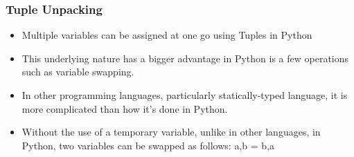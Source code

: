 \documentclass{beamer}
\begin{document}
\begin{frame}
\frametitle{Tuple Unpacking}
\begin{itemize}
\item Multiple variables can be assigned at one go using Tuples in Python
\item This underlying nature has a bigger advantage in Python is a few  operations such as variable swapping.
\item In other programming languages, particularly statically-typed language, it is more complicated than how it's done in Python.
\item Without the use of a temporary variable, unlike in other languages, in Python, two variables can be swapped as follows:
a,b = b,a
\end{itemize}
\end{frame}
\end{document}
